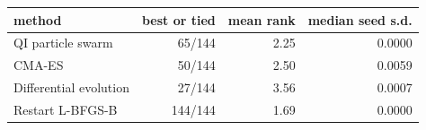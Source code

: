\begin{tabular}{lrrr}
\toprule
method & best or tied & mean rank & median seed s.d. \\
\midrule
QI particle swarm & 65/144 & 2.25 & 0.0000 \\
CMA-ES & 50/144 & 2.50 & 0.0059 \\
Differential evolution & 27/144 & 3.56 & 0.0007 \\
Restart L-BFGS-B & 144/144 & 1.69 & 0.0000 \\
\bottomrule
\end{tabular}